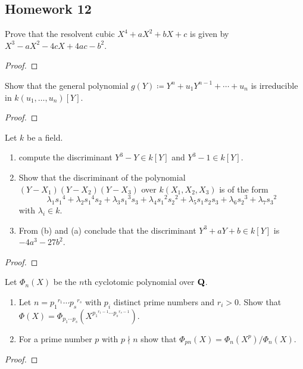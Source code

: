 \subsection{Homework 12}
\begin{problem}
Prove that the resolvent cubic $X^4+aX^2+bX+c$ is given by
$X^3-aX^2-4cX+4ac-b^2$.
\end{problem}
\begin{proof}
\end{proof}

\begin{problem}
Show that the general polynomial $g(Y)\coloneqq Y^n+u_1Y^{n-1}+\dotsb+u_n$
is irreducible in $k(u_1,\dotsc,u_n)[Y]$.
\end{problem}
\begin{proof}
\end{proof}

\begin{problem}
Let $k$ be a field.
\begin{enumerate}[label=(\alph*),noitemsep]
\item compute the discriminant $Y^3-Y\in k[Y]$ and $Y^3-1\in k[Y]$.
\item Show that the discriminant of the polynomial $(Y-X_1)(Y-X_2)(Y-X_3)$
  over $k(X_1,X_2,X_3)$ is of the form
  \[
    \lambda_1{s_1}^4+\lambda_2{s_1}^4s_2+\lambda_3{s_1}^3s_3+\lambda_4{s_1}^2{s_2}^2+\lambda_5s_1s_2s_3+\lambda_6{s_2}^3+\lambda_7{s_3}^2
  \]
  with $\lambda_i\in k$.
\item From (b) and (a) conclude that the discriminant $Y^3+aY+b\in k[Y]$ is
  $-4a^3-27b^2$.
\end{enumerate}
\end{problem}
\begin{proof}
\end{proof}

\begin{problem}
Let $\Phi_n(X)$ be the $n$th cyclotomic polynomial over $\mathbf{Q}$.
\begin{enumerate}[label=(\alph*),noitemsep]
\item Let $n={p_1}^{r_1}\dotsm{p_s}^{r_s}$ with $p_i$ distinct prime
  numbers and $r_i>0$. Show that $\Phi(X)=\Phi_{p_1\dotsm
    p_s}(X^{{p_1}^{r_1-1}\dotsm{p_s}^{r_s-1}})$.
\item For a prime number $p$ with $p\nmid n$ show that
  $\Phi_{pn}(X)=\Phi_n(X^p)/\Phi_n(X)$.
\end{enumerate}
\end{problem}
\begin{proof}
\end{proof}

